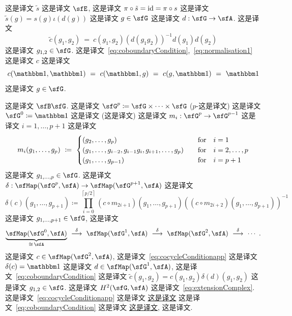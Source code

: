 \documentclass[
    affil-it, %
    auth-lg, %
    british, %
    compression, %
    contents, %
    custom-packages={}, %
    references={bigone}, %
]{lib/preprint}
\begin{document}
\begin{body}
 这是译文 $\tilde s$ 这是译文 $\sfE$, 这是译文 $\pi\circ\tilde s=\mathrm{id}=\pi\circ s$ 这是译文 $\tilde s(g)=s(g)\iota(d(g))$ 这是译文 $g\in\sfG$ 这是译文 $d:\sfG\rightarrow\sfA$. 这是译文         \begin{equation}\label{eq:coboundaryCondition}
            \tilde c(g_1,g_2)\ =\ c(g_1,g_2)(d(g_1g_2))^{-1}d(g_1)d(g_2) 
        \end{equation}  这是译文 $g_{1,2}\in\sfG$. 这是译文~\eqref{eq:coboundaryCondition},~\eqref{eq:normalisation1} 这是译文 $c$ 这是译文         \begin{equation}\label{eq:normalisation2}
            c(\unit,\unit)\ =\ c(\unit,g)\ =\ c(g,\unit)\ =\ \unit
        \end{equation}  这是译文 $g\in\sfG$.
        
 这是译文 $\sfB\sfG$. 这是译文 $\sfG^p\coloneqq\sfG\times\cdots\times\sfG$ ($p$-这是译文) 这是译文 $\sfG^0\coloneqq\unit$ 这是译文 (这是译文) 这是译文 $m_i:\sfG^{p}\rightarrow\sfG^{p-1}$ 这是译文 $i=1,\ldots,p+1$ 这是译文         \begin{equation}
            m_i(g_1,\ldots,g_{p})\ \coloneqq\ 
            \begin{cases}
                (g_2,\ldots,g_{p}) &\efor i=1
                \\
                (g_1,\ldots,g_{i-2},g_{i-1}g_i,g_{i+1},\ldots,g_{p}) &\efor i=2,\ldots,p
                \\
                (g_1,\ldots,g_{p-1}) &\efor i=p+1
            \end{cases}
        \end{equation}  这是译文 $g_{1,\ldots,p}\in\sfG$. 这是译文 $\delta:\sfMap(\sfG^p,\sfA)\rightarrow\sfMap(\sfG^{p+1},\sfA)$ 这是译文         \begin{equation}
            \delta(c)(g_1,\ldots,g_{p+1}) \coloneqq \prod_{i=0}^{\left\lceil p/2\right\rceil}(c\circ m_{2i+1})(g_1,\ldots,g_{p+1})((c\circ m_{2i+2})(g_1,\ldots,g_{p+1}))^{-1}
        \end{equation}  这是译文 $g_{1,\ldots,p+1}\in\sfG$, 这是译文         \begin{equation}\label{eq:extensionComplex}
            \underbrace{\sfMap(\sfG^0,\sfA)}_{\cong\,\sfA}\ \overset{\delta}{\longrightarrow}\ \sfMap(\sfG^1,\sfA)\ \overset{\delta}{\longrightarrow}\ \sfMap(\sfG^2,\sfA)\ \overset{\delta}{\longrightarrow}\ \cdots~.
        \end{equation}  这是译文 $c\in\sfMap(\sfG^2,\sfA)$, 这是译文~\eqref{eq:cocycleConditionapp} 这是译文 $\delta(c)=\unit$ 这是译文 $d\in\sfMap(\sfG^1,\sfA)$, 这是译文~\eqref{eq:coboundaryCondition} 这是译文 $\tilde c(g_1,g_2)=c(g_1,g_2)\delta(d)(g_1,g_2)$ 这是译文 $g_{1,2}\in\sfG$. 这是译文 $H^2(\sfG,\sfA)$ 这是译文~\eqref{eq:extensionComplex}. 这是译文~\eqref{eq:cocycleConditionapp} 这是译文 \uline{这是译文} 这是译文~\eqref{eq:coboundaryCondition} 这是译文 \uline{这是译文}, 这是译文. 
        

\end{body}
\end{document}
